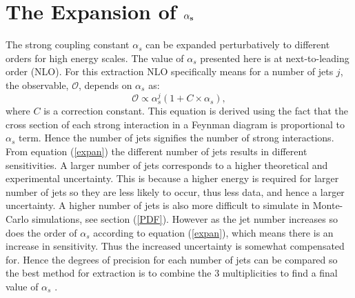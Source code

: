 \documentclass[12pt, onecolumn, nofootinbib]{revtex4}    %
\begin{document}
\section{The Expansion of ${\bold{\alpha_s}}$}

The strong coupling constant ${\alpha_s}$ can be expanded perturbatively to different orders for high energy scales. The value of ${\alpha _s}$ presented here is at next-to-leading order (NLO).  For this extraction NLO specifically means for a number of jets $j$, the observable, ${\mathcal{O}}$, depends on ${\alpha _s}$ as: \begin{equation} \label{expan} \mathcal{O} \propto \alpha _s^j (1 + C\times\alpha_s), \end{equation} where ${C}$ is a correction constant. This equation is derived using the fact that the cross section of each strong interaction in a Feynman diagram is proportional to ${\alpha_s}$ term. Hence the number of jets signifies the number of strong interactions. From equation (\ref{expan}) the different number of jets results in different sensitivities.  A larger number of jets corresponds to a higher theoretical and experimental uncertainty. This is because a higher energy is required for larger number of jets so they are less likely to occur, thus less data, and hence a larger uncertainty. A higher number of jets is also more difficult to simulate in Monte-Carlo simulations, see section (\ref{PDF}). However as the jet number increases so does the order of ${\alpha_s}$ according to equation (\ref{expan}), which means there is an increase in sensitivity. Thus the increased uncertainty is somewhat compensated for. Hence the degrees of precision for each number of jets can be compared so the best method for extraction is to combine the 3 multiplicities to find a final value of ${\alpha _s}$ \cite{DMP}. 
\end{document}

